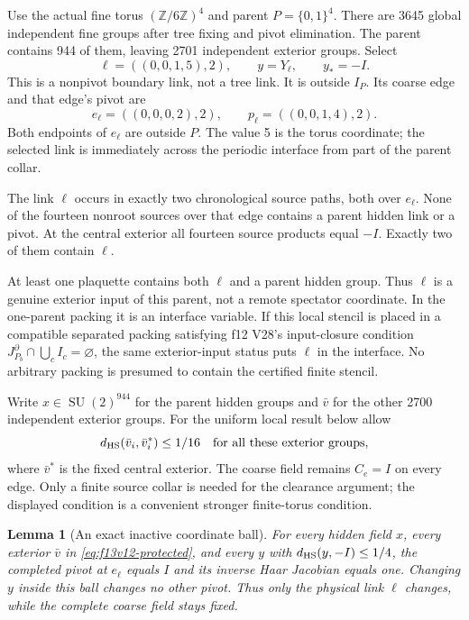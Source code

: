 \documentclass[11pt,oneside]{article}
\newtheorem{lemma}[theorem]{Lemma}
\DeclareMathOperator{\SU}{SU}
\begin{document}
Use the actual fine torus \((\mathbb Z/6\mathbb Z)^4\)
and parent \(P=\{0,1\}^4\). There are 3645 global
independent fine groups after tree fixing and pivot
elimination. The parent contains 944 of them, leaving
2701 independent exterior groups. Select
\[
 \ell=((0,0,1,5),2),\qquad y=Y_\ell,\qquad y_*=-I .
\]
This is a nonpivot boundary link, not a tree link.
It is outside \(I_P\). Its coarse edge and that
edge's pivot are
\[
 e_\ell=((0,0,0,2),2),\qquad
 p_\ell=((0,0,1,4),2).
\]
Both endpoints of \(e_\ell\) are outside \(P\).
The value 5 is the torus coordinate; the selected
link is immediately across the periodic interface
from part of the parent collar.

The link \(\ell\) occurs in exactly two chronological
source paths, both over \(e_\ell\). None of the
fourteen nonroot sources over that edge contains a
parent hidden link or a pivot. At the central exterior
all fourteen source products equal \(-I\). Exactly
two of them contain \(\ell\).

At least one plaquette contains both \(\ell\) and a
parent hidden group. Thus \(\ell\) is a genuine
exterior input of this parent, not a remote
spectator coordinate. In the one-parent packing it
is an interface variable. If this local stencil is
placed in a compatible separated packing satisfying
f12 V28's input-closure condition
\(J_{P_b}^{\partial}\cap\bigcup_c I_c=\varnothing\),
the same exterior-input status puts \(\ell\) in
the interface. No arbitrary packing is presumed
to contain the certified finite stencil.

Write \(x\in\SU(2)^{944}\) for the parent hidden
groups and \(\bar v\) for the other 2700 independent
exterior groups. For the uniform local result below
allow
\begin{equation}\label{eq:f13v12-protected}
 d_{\rm HS}(\bar v_i,\bar v_i^*)\le1/16
          \quad\hbox{for all these exterior groups},
\end{equation}
where \(\bar v^*\) is the fixed central exterior.
The coarse field remains \(C_e=I\) on every edge.
Only a finite source collar is needed for the
clearance argument; the displayed condition is a
convenient stronger finite-torus condition.

\begin{lemma}[An exact inactive coordinate ball]
\label{lem:f13v12-inactive}
For every hidden field \(x\), every exterior
\(\bar v\) in \eqref{eq:f13v12-protected}, and every
\(y\) with \(d_{\rm HS}(y,-I)\le1/4\), the completed
pivot at \(e_\ell\) equals \(I\) and its inverse
Haar Jacobian equals one. Changing \(y\) inside
this ball changes no other pivot. Thus only the
physical link \(\ell\) changes, while the complete
coarse field stays fixed.
\end{lemma}
\end{document}
